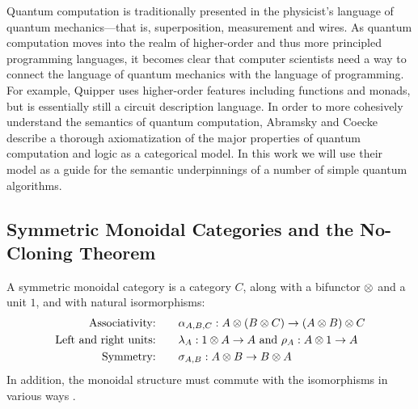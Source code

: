 
Quantum computation is traditionally presented in the physicist's language
of quantum mechanics---that is, superposition, measurement and wires. 
As quantum computation moves into the realm of higher-order and thus more principled
programming languages, it becomes clear that computer scientists need a way to 
connect the language of quantum mechanics with the language of programming. 
For example, Quipper\cite{green13quipper} uses higher-order features including
functions and monads, but is essentially still a circuit description language.
In order to more cohesively understand the semantics of quantum computation,
Abramsky and Coecke\cite{abramsky2009categorical} describe a thorough 
axiomatization of the major properties of quantum computation and logic
as a categorical model. In this work we will use their model as a guide
for the semantic underpinnings of a number of simple quantum algorithms.


\subsection{Symmetric Monoidal Categories and the No-Cloning Theorem}

\begin{definition}
A symmetric monoidal category is a category $C$, along with a bifunctor $\otimes$
and a unit $1$, and with natural isormorphisms:
\begin{align*}
    \text{Associativity:}&\qquad 
    \alpha_{A,B,C} : A \otimes (B \otimes C) \rightarrow (A \otimes B) \otimes C \\
    \text{Left and right units:}&\qquad 
    \lambda_A : 1 \otimes A \rightarrow A \text{ and } \rho_A : A \otimes 1 \rightarrow A \\
    \text{Symmetry:}&\qquad 
    \sigma_{A,B} : A \otimes B \rightarrow B \otimes A \\
\end{align*}
In addition, the monoidal structure must commute with the isomorphisms in 
various ways .
\end{definition}

